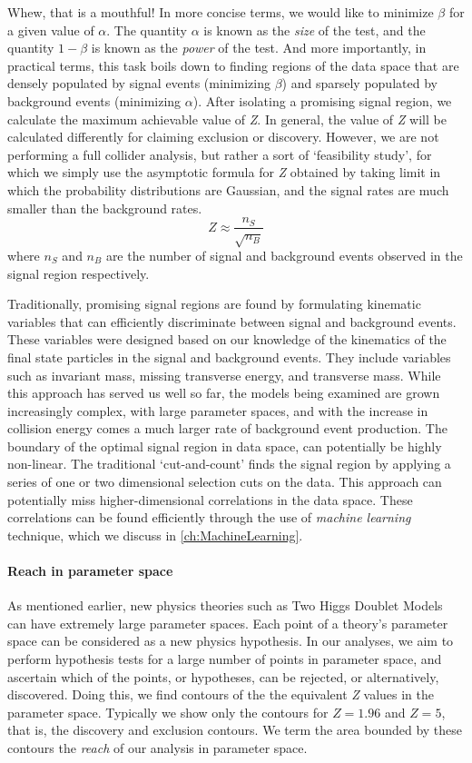 Whew, that is a mouthful! In more concise terms, we would like to minimize $\beta$ for a given value of $\alpha$. The quantity $\alpha$ is known as the \emph{size} of the test, and the quantity $1-\beta$ is known as the \emph{power} of the test. And more importantly, in practical terms, this task boils down to finding regions of the data space that are densely populated by signal events (minimizing $\beta$) and sparsely populated by background events (minimizing $\alpha$). After isolating a promising signal region, we calculate the maximum achievable value of \emph{Z}. In general, the value of \emph{Z} will be calculated differently for claiming exclusion or discovery. However, we are not performing a full collider analysis, but rather a sort of `feasibility study', for which we simply use the asymptotic formula for \emph{Z} obtained by taking limit in which the probability distributions are Gaussian, and the signal rates are much smaller than the background rates.
\[Z \approx \frac{n_S}{\sqrt{n_B}}\]
where $n_S$ and $n_B$ are the number of signal and background events observed in the signal region respectively.

Traditionally, promising signal regions are found by formulating kinematic variables that can efficiently discriminate between signal and background events. These variables were designed based on our knowledge of the kinematics of the final state particles in the signal and background events. They include variables such as invariant mass, missing transverse energy, and transverse mass. While this approach has served us well so far, the models being examined are grown increasingly complex, with large parameter spaces, and with the increase in collision energy comes a much larger rate of background event production. The boundary of the optimal signal region in data space, can potentially be highly non-linear. The traditional `cut-and-count' finds the signal region by applying a series of one or two dimensional selection cuts on the data. This approach can potentially miss higher-dimensional correlations in the data space. These correlations can be found efficiently through the use of \emph{machine learning} technique, which we discuss in \autoref{ch:MachineLearning}.

\paragraph{Reach in parameter space} As mentioned earlier, new physics theories such as Two Higgs Doublet Models can have extremely large parameter spaces. Each point of a theory's parameter space can be considered as a new physics hypothesis. In our analyses, we aim to perform hypothesis tests for a large number of points in parameter space, and ascertain which of the points, or hypotheses, can be rejected, or alternatively, discovered. Doing this, we find contours of the the equivalent \emph{Z} values in the parameter space. Typically we show only the contours for $Z = 1.96$ and $Z=5$, that is, the discovery and exclusion contours. We term the area bounded by these contours the \emph{reach} of our analysis in parameter space. 

